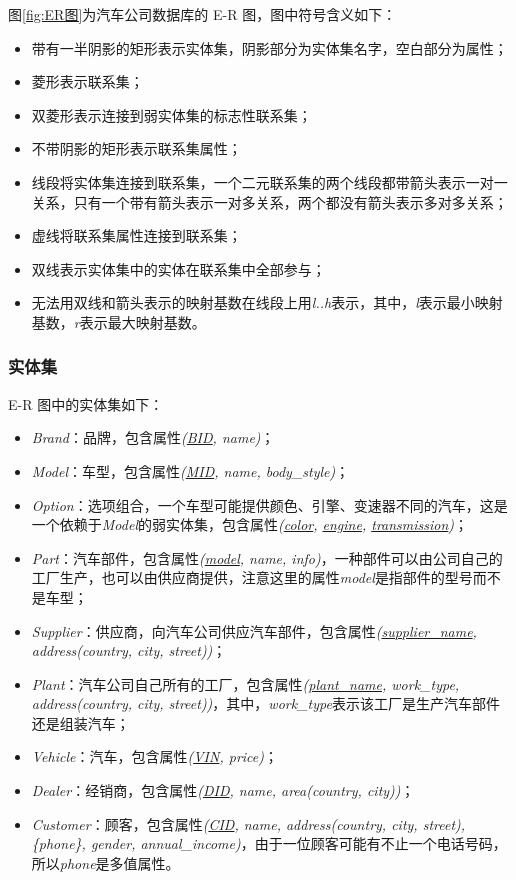 \documentclass[hyperref,a4paper,UTF8]{ctexart}
\begin{document}
图\ref{fig:ER图}为汽车公司数据库的 E-R 图，图中符号含义如下：

\begin{itemize}[itemsep=2pt,topsep=0pt,parsep=0pt]
    \item 带有一半阴影的矩形表示实体集，阴影部分为实体集名字，空白部分为属性；
    \item 菱形表示联系集；
    \item 双菱形表示连接到弱实体集的标志性联系集；
    \item 不带阴影的矩形表示联系集属性；
    \item 线段将实体集连接到联系集，一个二元联系集的两个线段都带箭头表示一对一关系，只有一个带有箭头表示一对多关系，两个都没有箭头表示多对多关系；
    \item 虚线将联系集属性连接到联系集；
    \item 双线表示实体集中的实体在联系集中全部参与；
    \item 无法用双线和箭头表示的映射基数在线段上用\textit{l..h}表示，其中，\textit{l}表示最小映射基数，\textit{r}表示最大映射基数。
\end{itemize}

\subsubsection{实体集}

E-R 图中的实体集如下：

\begin{itemize}[itemsep=2pt,topsep=0pt,parsep=0pt]
    \item \textit{Brand}：品牌，包含属性\textit{(\underline{BID}, name)}；
    \item \textit{Model}：车型，包含属性\textit{(\underline{MID}, name, body\_style)}；
    \item \textit{Option}：选项组合，一个车型可能提供颜色、引擎、变速器不同的汽车，这是一个依赖于\textit{Model}的弱实体集，包含属性\textit{(\underline{color}, \underline{engine}, \underline{transmission})}；
    \item \textit{Part}：汽车部件，包含属性\textit{(\underline{model}, name, info)}，一种部件可以由公司自己的工厂生产，也可以由供应商提供，注意这里的属性\textit{model}是指部件的型号而不是车型；
    \item \textit{Supplier}：供应商，向汽车公司供应汽车部件，包含属性\textit{(\underline{supplier\_name}, address(country, city, street))}；
    \item \textit{Plant}：汽车公司自己所有的工厂，包含属性\textit{(\underline{plant\_name}, work\_type, address(country, city, street))}，其中，\textit{work\_type}表示该工厂是生产汽车部件还是组装汽车；
    \item \textit{Vehicle}：汽车，包含属性\textit{(\underline{VIN}, price)}；
    \item \textit{Dealer}：经销商，包含属性\textit{(\underline{DID}, name, area(country, city))}；
    \item \textit{Customer}：顾客，包含属性\textit{(\underline{CID}, name, address(country, city, street), \{phone\}, gender, annual\_income)}，由于一位顾客可能有不止一个电话号码，所以\textit{phone}是多值属性。
\end{itemize}
\end{document}
